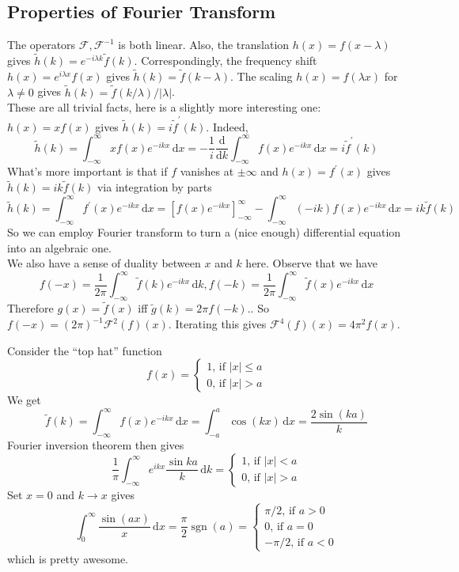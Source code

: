 \subsection{Properties of Fourier Transform}
The operators $\mathcal F,\mathcal F^{-1}$ is both linear.
Also, the translation $h(x)=f(x-\lambda)$ gives $\tilde{h}(k)=e^{-i\lambda k}\tilde{f}(k)$.
Correspondingly, the frequency shift $h(x)=e^{i\lambda x}f(x)$ gives $\tilde{h}(k)=\tilde{f}(k-\lambda)$.
The scaling $h(x)=f(\lambda x)$ for $\lambda\neq 0$ gives $\tilde{h}(k)=\tilde{f}(k/\lambda)/|\lambda|$.\\
These are all trivial facts, here is a slightly more interesting one:
$h(x)=xf(x)$ gives $\tilde{h}(k)=i\tilde{f}^\prime(k)$.
Indeed,
$$\tilde{h}(k)=\int_{-\infty}^\infty xf(x)e^{-ikx}\,\mathrm dx=-\frac{1}{i}\frac{\mathrm d}{\mathrm dk}\int_{-\infty}^\infty f(x)e^{-ikx}\,\mathrm dx=i\tilde{f}^\prime(k)$$
What's more important is that if $f$ vanishes at $\pm\infty$ and $h(x)=f^\prime(x)$ gives $\tilde{h}(k)=ik\tilde{f}(k)$ via integration by parts
$$\tilde{h}(k)=\int_{-\infty}^\infty f^\prime(x)e^{-ikx}\,\mathrm dx=[f(x)e^{-ikx}]_{-\infty}^\infty-\int_{-\infty}^\infty (-ik)f(x)e^{-ikx}\,\mathrm dx=ik\tilde{f}(k)$$
So we can employ Fourier transform to turn a (nice enough) differential equation into an algebraic one.\\
We also have a sense of duality between $x$ and $k$ here.
Observe that we have
$$f(-x)=\frac{1}{2\pi}\int_{-\infty}^\infty\tilde{f}(k)e^{-ikx}\,\mathrm dk,f(-k)=\frac{1}{2\pi}\int_{-\infty}^\infty\tilde{f}(x)e^{-ikx}\,\mathrm dx$$
Therefore $g(x)=\tilde{f}(x)$ iff $\tilde{g}(k)=2\pi f(-k)$..
So $f(-x)=(2\pi)^{-1}\mathcal F^2(f)(x)$.
Iterating this gives $\mathcal F^4(f)(x)=4\pi^2f(x)$.
\begin{example}
    Consider the ``top hat'' function
    $$f(x)=\begin{cases}
        1\text{, if $|x|\le a$}\\
        0\text{, if $|x|>a$}
    \end{cases}$$
    We get
    $$\tilde{f}(k)=\int_{-\infty}^\infty f(x)e^{-ikx}\,\mathrm dx=\int_{-a}^a\cos(kx)\,\mathrm dx=\frac{2\sin(ka)}{k}$$
    Fourier inversion theorem then gives
    $$\frac{1}{\pi}\int_{-\infty}^\infty e^{ikx}\frac{\sin ka}{k}\,\mathrm dk=\begin{cases}
        1\text{, if $|x|<a$}\\
        0\text{, if $|x|>a$}
    \end{cases}$$
    Set $x=0$ and $k\to x$ gives
    $$\int_0^\infty\frac{\sin(ax)}{x}\,\mathrm dx=\frac{\pi}{2}\operatorname{sgn}(a)=\begin{cases}
        \pi/2\text{, if $a>0$}\\
        0\text{, if $a=0$}\\
        -\pi/2\text{, if $a<0$}
    \end{cases}$$
    which is pretty awesome.
\end{example}
